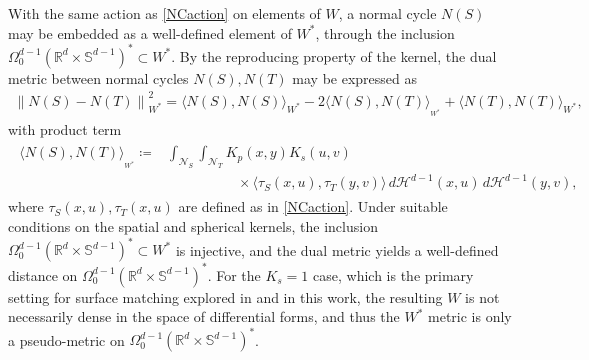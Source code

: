 \documentclass[sn-mathphys-num]{sn-jnl}%
\theoremstyle{thmstyleone}%
\theoremstyle{thmstyletwo}%
\theoremstyle{thmstylethree}%
\numberwithin{remark}{section}
\numberwithin{definition}{section}
\numberwithin{equation}{section}
\numberwithin{theorem}{section}
\newcommand{\norm}[1]{\left\lVert#1\right\rVert}
\newcommand{\R}{\ensuremath{\mathbb{R}}}%
\begin{document}
With the same action as \cref{NCaction} on elements of $W$, a normal cycle $N(S)$ may be embedded as a well-defined element of $W^{*}$, through the inclusion $\Omega_{0}^{d-1}(\R^{d}\times \mathbb{S}^{d-1})^{*} \subset W^{*}$. By the reproducing property of the kernel, the dual metric between normal cycles $N(S),N(T)$ may be expressed  as
\begin{align*}
    \norm{N(S) - N(T) }_{W^{*}}^{2} = \langle N(S),N(S)\rangle_{{W^{*}}} - 2\langle N(S),N(T)\rangle_{_{W^{*}}} + \langle N(T),N(T) \rangle_{{W^{*}}},
\end{align*}
with product term
\begin{gather}\label{NCinnerprod}
\begin{split}
    \langle N(S),N(T)\rangle_{_{W^{*}}} \coloneq& \int_{\mathcal{N}_{S}}
    \int_{\mathcal{N}_{T}}
    K_{p}(x,y)
    K_{s}(u,v)\\
    &\qquad\qquad\quad
    \times
    \langle
    \tau_{S}(x,u),\tau_{T}(y,v)\rangle
    \,d\mathcal{H}^{d-1}(x,u) \,d\mathcal{H}^{d-1}(y,v),
\end{split}
\end{gather}
where $\tau_{S}(x,u),\tau_{T}(x,u)$ are defined as in \cref{NCaction}. Under suitable conditions on the spatial and spherical kernels,  the inclusion $\Omega_{0}^{d-1}(\R^{d}\times \mathbb{S}^{d-1})^{*} \subset W^{*}$ is injective, and the dual metric yields a well-defined distance on $\Omega_{0}^{d-1}(\R^{d}\times \mathbb{S}^{d-1})^{*}$. For the $K_{s}=1$ case, which is the primary setting for surface matching explored in \cite{NCpaper} and in this work, the resulting $W$ is not necessarily dense in the space of differential forms, and thus the $W^{*}$ metric is only a pseudo-metric on $\Omega_{0}^{d-1}(\R^{d}\times \mathbb{S}^{d-1})^{*}$. 
\end{document}
